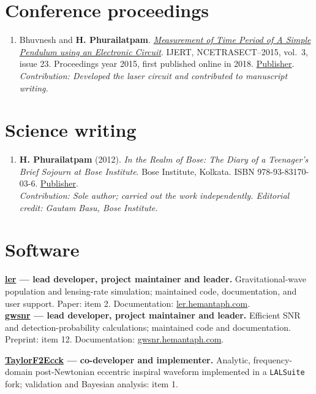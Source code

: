 \documentclass[11pt]{article}
\begin{document}
\section*{Conference proceedings}
\begin{enumerate}[start=14]
\item Bhuvnesh and \textbf{H. Phurailatpam}. \href{https://www.ijert.org/measurement-of-time-period-of-a-simple-pendulum-using-an-electronic-circuit}{\textit{Measurement of Time Period of A Simple Pendulum using an Electronic Circuit}}. IJERT, NCETRASECT--2015, vol.\ 3, issue 23. Proceedings year 2015, first published online in 2018. \href{https://www.ijert.org/measurement-of-time-period-of-a-simple-pendulum-using-an-electronic-circuit}{Publisher}.\\\emph{Contribution: Developed the laser circuit and contributed to manuscript writing.}
\end{enumerate}
\section*{Science writing}
\begin{enumerate}[start=15]
\item \textbf{H. Phurailatpam} (2012). \textit{In the Realm of Bose: The Diary of a Teenager's Brief Sojourn at Bose Institute}. Bose Institute, Kolkata. ISBN 978-93-83170-03-6. \href{https://jcbose.ac.in/publication}{Publisher}.\\\emph{Contribution: Sole author; carried out the work independently. Editorial credit: Gautam Basu, Bose Institute.}
\end{enumerate}
\section*{Software}
\textbf{\href{https://ler.hemantaph.com/}{ler} --- lead developer, project maintainer and leader.} Gravitational-wave population and lensing-rate simulation; maintained code, documentation, and user support. Paper: item 2. Documentation: \href{https://ler.hemantaph.com/}{ler.hemantaph.com}.\\
\textbf{\href{https://gwsnr.hemantaph.com/}{gwsnr} --- lead developer, project maintainer and leader.} Efficient SNR and detection-probability calculations; maintained code and documentation. Preprint: item 12. Documentation: \href{https://gwsnr.hemantaph.com/}{gwsnr.hemantaph.com}.

\textbf{\href{https://arxiv.org/abs/2508.12697}{TaylorF2Ecck} --- co-developer and implementer.} Analytic, frequency-domain post-Newtonian eccentric inspiral waveform implemented in a \texttt{LALSuite} fork; validation and Bayesian analysis: item 1.
\end{document}
